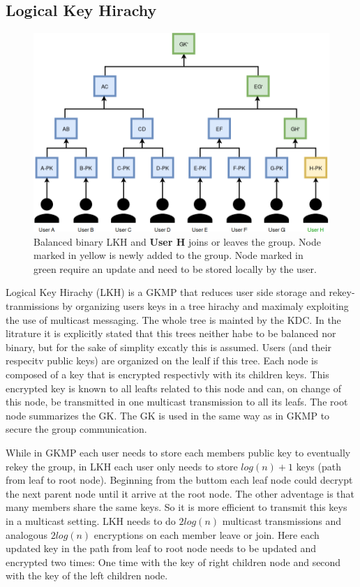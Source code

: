 \subsection{Logical Key Hirachy}
\begin{figure}[!ht]
\centering
    \includegraphics[width=0.8\linewidth]{img/LKH.png}
    \caption{Balanced binary LKH and \textbf{User H} joins or leaves the group. Node marked in yellow is newly added to the group. Node marked in green require an update and need to be stored locally by the user.}
    \label{fig:lkh}
\end{figure}

Logical Key Hirachy (LKH)\cite{wallner1999key} is a GKMP that reduces user side storage and rekey-tranmissions by organizing users keys in a tree hirachy and maximaly exploiting the use of multicast messaging. The whole tree is mainted by the KDC. In the litrature it is explicitly stated that this trees neither habe to be balanced nor binary, but for the sake of simplity excatly this is assumed. Users (and their respecitv public keys) are organized on the lealf if this tree. Each node is composed of a key that is encrypted respectivly with its children keys. This encrypted key is known to all leafts related to this node and can, on change of this node, be transmitted in one multicast transmission to all its leafs. The root node summarizes the GK. The GK is used in the same way as in GKMP to secure the group communication. 

While in GKMP each user needs to store each members public key to eventually rekey the group, in LKH each user only needs to store $log(n) +1$ keys (path from leaf to root node). Beginning from the buttom each leaf node could decrypt the next parent node until it arrive at the root node. The other adventage is that many members share the same keys. So it is more efficient to transmit this keys in a multicast setting. LKH needs to do $2log(n)$ multicast transmissions and analogous $2log(n)$ encryptions on each member leave or join.  Here each updated key in the path from leaf to root node needs to be updated and encrypted two times: One time with the key of right children node and second with the key of the left children node. 

